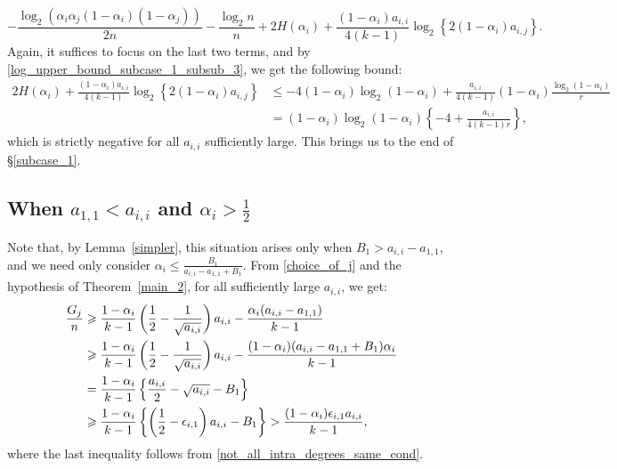 \documentclass[11pt,reqno]{amsart}
\theoremstyle{definition}
\theoremstyle{remark}
\theoremstyle{conjecture}
\begin{document}
\begin{equation}
-\frac{\log_{2}(\alpha_{i} \alpha_{j} (1-\alpha_{i}) (1-\alpha_{j}))}{2n} - \frac{\log_{2} n}{n} + 2 H(\alpha_{i}) + \frac{(1-\alpha_{i}) a_{i,i}}{4(k-1)} \log_{2} \left\{2(1-\alpha_{i})a_{i,j}\right\}. \nonumber
\end{equation}
Again, it suffices to focus on the last two terms, and by \eqref{log_upper_bound_subcase_1_subsub_3}, we get the following bound:
\begin{align}
2 H(\alpha_{i}) + \frac{(1-\alpha_{i}) a_{i,i}}{4(k-1)} \log_{2} \left\{2(1-\alpha_{i})a_{i,j}\right\} &\leqslant -4(1-\alpha_{i}) \log_{2}(1-\alpha_{i}) + \frac{a_{i,i}}{4(k-1)} (1-\alpha_{i}) \frac{\log_{2}(1-\alpha_{i})}{r} \nonumber\\
&= (1-\alpha_{i}) \log_{2}(1-\alpha_{i})\left\{-4 + \frac{a_{i,i}}{4(k-1)r}\right\}, \nonumber
\end{align}
which is strictly negative for all $a_{i,i}$ sufficiently large. This brings us to the end of \S\ref{subcase_1}.

\subsection{When $a_{1,1} < a_{i,i}$ and $\alpha_{i} > \frac{1}{2}$}\label{subcase_2} Note that, by Lemma~\ref{simpler}, this situation arises only when $B_{1} > a_{i,i} - a_{1,1}$, and we need only consider $\alpha_{i} \leqslant \frac{B_{1}}{a_{i,i} - a_{1,1} + B_{1}}$. From \eqref{choice_of_j} and the hypothesis of Theorem~\ref{main_2}, for all sufficiently large $a_{i,i}$, we get:
\begin{align}\label{G_{j}_lower_bound_subcase_2}
\frac{G_{j}}{n} & \geqslant \frac{1-\alpha_{i}}{k-1} \left(\frac{1}{2} - \frac{1}{\sqrt{a_{i,i}}}\right) a_{i,i} - \frac{\alpha_{i} (a_{i,i} - a_{1,1})}{k-1} \nonumber\\
&\geqslant \frac{1-\alpha_{i}}{k-1} \left(\frac{1}{2} - \frac{1}{\sqrt{a_{i,i}}}\right) a_{i,i} - \frac{(1-\alpha_{i}) (a_{i,i} - a_{1,1} + B_{1}) \alpha_{i}}{k-1} \nonumber\\
&= \frac{1-\alpha_{i}}{k-1}\left\{\frac{a_{i,i}}{2} - \sqrt{a_{i,i}} - B_{1}\right\} \nonumber\\
&\geqslant \frac{1-\alpha_{i}}{k-1}\left\{\left(\frac{1}{2} - \epsilon_{i,1}\right) a_{i,i} - B_{1}\right\} > \frac{(1-\alpha_{i}) \epsilon_{i,1} a_{i,i}}{k-1},
\end{align}
where the last inequality follows from \eqref{not_all_intra_degrees_same_cond}. 
\end{document}
